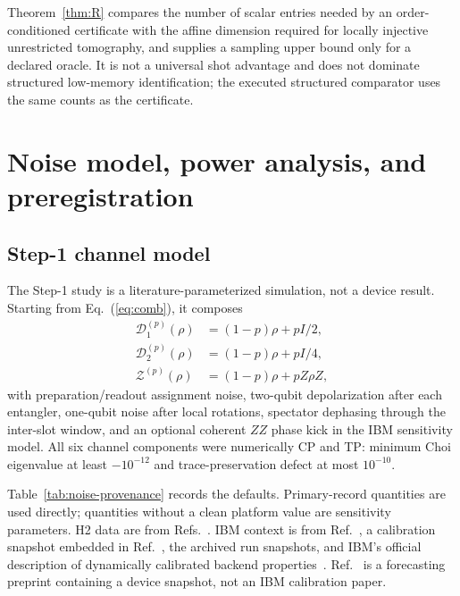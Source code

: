 \documentclass[aps,prl,reprint,superscriptaddress,nofootinbib]{revtex4-2}
\begin{document}
Theorem~\ref{thm:R} compares the number of scalar entries needed by an order-conditioned certificate with the affine dimension required for locally injective unrestricted tomography, and supplies a sampling upper bound only for a declared oracle.  It is not a universal shot advantage and does not dominate structured low-memory identification; the executed structured comparator uses the same counts as the certificate.

\section{Noise model, power analysis, and preregistration}
\label{sec:benchmark}

\subsection{Step-1 channel model}

The Step-1 study is a literature-parameterized simulation, not a device result.  Starting from Eq.~(\ref{eq:comb}), it composes
\begin{align}
 \mathcal D_1^{(p)}(\rho)&=(1-p)\rho+pI/2,\nonumber\\
 \mathcal D_2^{(p)}(\rho)&=(1-p)\rho+pI/4,\nonumber\\
 \mathcal Z^{(p)}(\rho)&=(1-p)\rho+pZ\rho Z,
 \label{eq:noise-channels}
\end{align}
with preparation/readout assignment noise, two-qubit depolarization after each entangler, one-qubit noise after local rotations, spectator dephasing through the inter-slot window, and an optional coherent $ZZ$ phase kick in the IBM sensitivity model.  All six channel components were numerically CP and TP: minimum Choi eigenvalue at least $-10^{-12}$ and trace-preservation defect at most $10^{-10}$.

Table~\ref{tab:noise-provenance} records the defaults.  Primary-record quantities are used directly; quantities without a clean platform value are sensitivity parameters.  H2 data are from Refs.~\cite{Moses2023Racetrack,DeCross2025RCS}.  IBM context is from Ref.~\cite{AbuGhanem2025IBM}, a calibration snapshot embedded in Ref.~\cite{Polche2026KQRC}, the archived run snapshots, and IBM's official description of dynamically calibrated backend properties~\cite{IBMBackendDetails2026}.  Ref.~\cite{Polche2026KQRC} is a forecasting preprint containing a device snapshot, not an IBM calibration paper.
\end{document}
